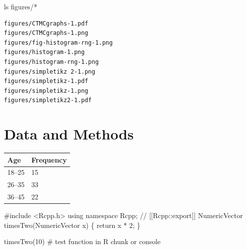 \documentclass[
	letterpaper,
	DIV=11,
	numbers=noendperiod]{scrartcl}
\newenvironment{Shaded}{\begin{snugshade}}{\end{snugshade}}
\newcommand{\CommentTok}[1]{\textcolor[rgb]{0.37,0.37,0.37}{#1}}
\newcommand{\DecValTok}[1]{\textcolor[rgb]{0.68,0.00,0.00}{#1}}
\newcommand{\FunctionTok}[1]{\textcolor[rgb]{0.28,0.35,0.67}{#1}}
\newcommand{\NormalTok}[1]{\textcolor[rgb]{0.00,0.23,0.31}{#1}}
\newcommand{\PreprocessorTok}[1]{\textcolor[rgb]{0.68,0.00,0.00}{#1}}
\begin{document}
\begin{Shaded}
	\begin{Highlighting}[]
		\FunctionTok{ls}\NormalTok{ figures/}\PreprocessorTok{*}
	\end{Highlighting}
\end{Shaded}

\begin{verbatim}
figures/CTMCgraphs-1.pdf
figures/CTMCgraphs-1.png
figures/fig-histogram-rng-1.png
figures/histogram-1.png
figures/histogram-rng-1.png
figures/simpletikz 2-1.png
figures/simpletikz-1.pdf
figures/simpletikz-1.png
figures/simpletikz2-1.pdf
\end{verbatim}

\hypertarget{sec-data-method}{%
	\section{Data and Methods}\label{sec-data-method}}

\begin{tabular}{|l|l|}\hline
	Age    & Frequency \\ \hline
	18--25 & 15        \\
	26--35 & 33        \\
	36--45 & 22        \\ \hline
\end{tabular}

\begin{Shaded}
	\begin{Highlighting}[]
		\NormalTok{\#include \textless{}Rcpp.h\textgreater{}}
		\NormalTok{using namespace Rcpp;}
		\NormalTok{// [[Rcpp::export]]}
		\NormalTok{NumericVector timesTwo(NumericVector x) \{}
		\NormalTok{  return x * 2;}
		\NormalTok{\}}
	\end{Highlighting}
\end{Shaded}

\begin{Shaded}
	\begin{Highlighting}[]
		\FunctionTok{timesTwo}\NormalTok{(}\DecValTok{10}\NormalTok{) }\CommentTok{\# test function in R chunk or console}
	\end{Highlighting}
\end{Shaded}
\end{document}
